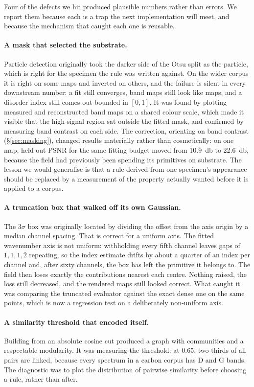 Four of the defects we hit produced plausible numbers rather than errors. We
report them because each is a trap the next implementation will meet, and
because the mechanism that caught each one is reusable.

\paragraph{A mask that selected the substrate.}
Particle detection originally took the darker side of the Otsu split as the
particle, which is right for the specimen the rule was written against. On the
wider corpus it is right on some maps and inverted on others, and the failure is
silent in every downstream number: a fit still converges, band maps still look
like maps, and a disorder index still comes out bounded in $[0,1]$. It was found
by plotting measured and reconstructed band maps on a shared colour scale, which
made it visible that the high-signal region sat outside the fitted mask, and
confirmed by measuring band contrast on each side. The correction, orienting on
band contrast (\S\ref{sec:masking}), changed results materially rather than
cosmetically: on one map, held-out PSNR for the same fitting budget moved from
\SI{10.9}{\decibel} to \SI{22.6}{\decibel}, because the field had previously
been spending its primitives on substrate. The lesson we would generalise is
that a rule derived from one specimen's appearance should be replaced by a
measurement of the property actually wanted before it is applied to a corpus.

\paragraph{A truncation box that walked off its own Gaussian.}
The $3\sigma$ box was originally located by dividing the offset from the axis
origin by a median channel spacing. That is correct for a uniform axis. The
fitted wavenumber axis is not uniform: withholding every fifth channel leaves
gaps of $1,1,1,2$ repeating, so the index estimate drifts by about a quarter of
an index per channel and, after sixty channels, the box has left the primitive
it belongs to. The field then loses exactly the contributions nearest each
centre. Nothing raised, the loss still decreased, and the rendered maps still
looked correct. What caught it was comparing the truncated evaluator against
the exact dense one on the same points, which is now a regression test on a
deliberately non-uniform axis.

\paragraph{A similarity threshold that encoded itself.}
Building  from an absolute cosine cut produced a graph with
communities and a respectable modularity. It was measuring the threshold: at
$0.65$, two thirds of all pairs are linked, because every spectrum in a carbon
corpus has D and G bands. The diagnostic was to plot the distribution of
pairwise similarity before choosing a rule, rather than after.

